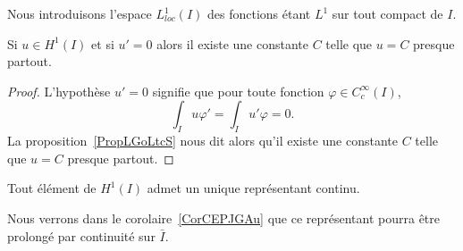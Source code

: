 Nous introduisons l'espace \( L^1_{loc}(I)\) des fonctions étant \( L^1\) sur tout compact de \( I\).

\begin{corollary}   \label{CorEVJYihj}
	Si \( u\in H^1(I)\) et si \( u'=0\) alors il existe une constante \( C\) telle que \( u=C\) presque partout.
\end{corollary}

\begin{proof}
	L'hypothèse \( u'=0\) signifie que pour toute fonction \( \varphi\in C^{\infty}_c(I)\),
	\begin{equation}
		\int_Iu\varphi'=\int_Iu'\varphi=0.
	\end{equation}
	La proposition~\ref{PropLGoLtcS} nous dit alors qu'il existe une constante \( C\) telle que \( u=C\) presque partout.
\end{proof}

\begin{lemma}   \label{LemMPkbZxX}
	Tout élément de \( H^1(I)\) admet un unique représentant continu.
\end{lemma}
Nous verrons dans le corolaire~\ref{CorCEPJGAu} que ce représentant pourra être prolongé par continuité sur \( \bar I\).

